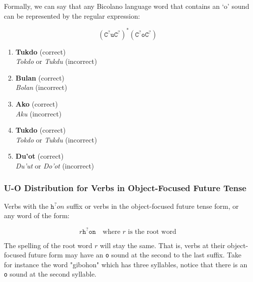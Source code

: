 Formally, we can say that any Bicolano language word that contains an ‘o’ sound can be represented by the regular expression:

\[
      \left(\texttt{C}^?\texttt{uC}^?\right)^* \left(\texttt{C}^?\texttt{oC}^?\right)
\]

\begin{example}
\end{example}

\begin{enumerate}
      \item \textbf{Tukdo} (correct) \\
            \textit{Tokdo} or \textit{Tukdu} (incorrect) \\
      \item \textbf{Bulan} (correct) \\
            \textit{Bolan} (incorrect) \\
      \item \textbf{Ako} (correct) \\
            \textit{Aku} (incorrect) \\
      \item \textbf{Tukdo} (correct) \\
            \textit{Tokdo} or \textit{Tukdu} (incorrect) \\
      \item \textbf{Du'ot} (correct) \\
            \textit{Du'ut} or \textit{Do'ot} (incorrect) \\
\end{enumerate}

\subsubsection{U-O Distribution for Verbs in Object-Focused Future Tense}

Verbs with the $\texttt{h}^?on$ suffix or verbs in the object-focused future tense form, or any word of the form:

\[
      r \texttt{h}^? \texttt{on} \quad \text{where } r \text{ is the root word}
\]

The spelling of the root word $r$ will stay the same. That is, verbs at their object-focused future form may have an \texttt{o} sound at the second to the last suffix. Take for instance the word "gibohon" which has three syllables, notice that there is an \texttt{o} sound at the second syllable.

\begin{example}
\end{example}

